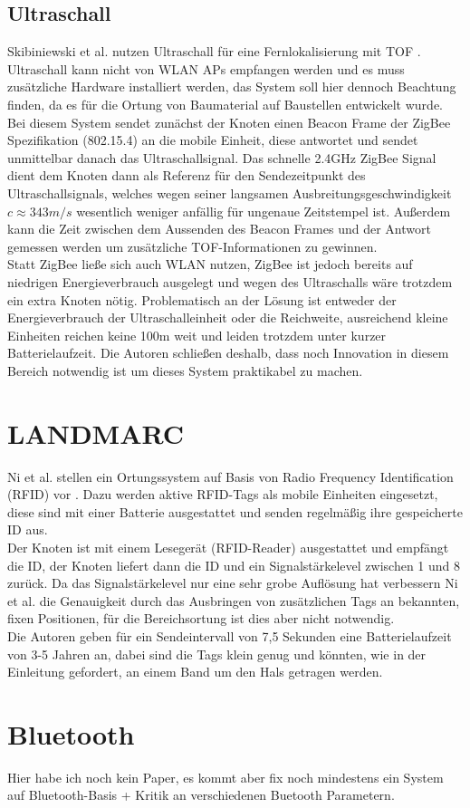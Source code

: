 \subsection{Ultraschall}
Skibiniewski et al. nutzen Ultraschall für eine Fernlokalisierung mit TOF \cite{skibniewski2009simulation}.
Ultraschall kann nicht von WLAN APs empfangen werden und es muss zusätzliche Hardware installiert werden, das System soll hier dennoch Beachtung finden, da es für die Ortung von Baumaterial auf Baustellen entwickelt wurde.\\
Bei diesem System sendet zunächst der Knoten einen Beacon Frame der ZigBee Spezifikation (802.15.4) an die mobile Einheit, diese antwortet und sendet unmittelbar danach das Ultraschallsignal.
Das schnelle 2.4GHz ZigBee Signal dient dem Knoten dann als Referenz für den Sendezeitpunkt des Ultraschallsignals, welches wegen seiner langsamen Ausbreitungsgeschwindigkeit $c \approx 343m/s$ wesentlich weniger anfällig für ungenaue Zeitstempel ist. 
Außerdem kann die Zeit zwischen dem Aussenden des Beacon Frames und der Antwort gemessen werden um zusätzliche TOF-Informationen zu gewinnen. \\
Statt ZigBee ließe sich auch WLAN nutzen, ZigBee ist jedoch bereits auf niedrigen Energieverbrauch ausgelegt und wegen des Ultraschalls wäre trotzdem ein extra Knoten nötig.
Problematisch an der Lösung ist entweder der Energieverbrauch der Ultraschalleinheit oder die Reichweite, ausreichend kleine Einheiten reichen keine 100m weit und leiden trotzdem unter kurzer Batterielaufzeit.
Die Autoren schließen deshalb, dass noch Innovation in diesem Bereich notwendig ist um dieses System praktikabel zu machen.

\section{LANDMARC}
\label{ch:Vorherige:sec:LANDMARC}
Ni et al. stellen ein Ortungssystem auf Basis von Radio Frequency Identification (RFID) vor \cite{ni2004landmarc}.
Dazu werden aktive RFID-Tags als mobile Einheiten eingesetzt, diese sind mit einer Batterie ausgestattet und senden regelmäßig ihre gespeicherte ID aus.\\
Der Knoten ist mit einem Lesegerät (RFID-Reader) ausgestattet und empfängt die ID, der Knoten liefert dann die ID und ein Signalstärkelevel zwischen 1 und 8 zurück. 
Da das Signalstärkelevel nur eine sehr grobe Auflösung hat verbessern Ni et al. die Genauigkeit durch das Ausbringen von zusätzlichen Tags an bekannten, fixen Positionen, für die Bereichsortung ist dies aber nicht notwendig.\\
Die Autoren geben für ein Sendeintervall von 7,5 Sekunden eine Batterielaufzeit von 3-5 Jahren an, dabei sind die Tags klein genug und könnten, wie in der Einleitung gefordert, an einem Band um den Hals getragen werden.

\section{Bluetooth}
\label{ch:Vorherige:sec:Bluetooth}
Hier habe ich noch kein Paper, es kommt aber fix noch mindestens ein System auf Bluetooth-Basis + Kritik an verschiedenen Buetooth Parametern.


